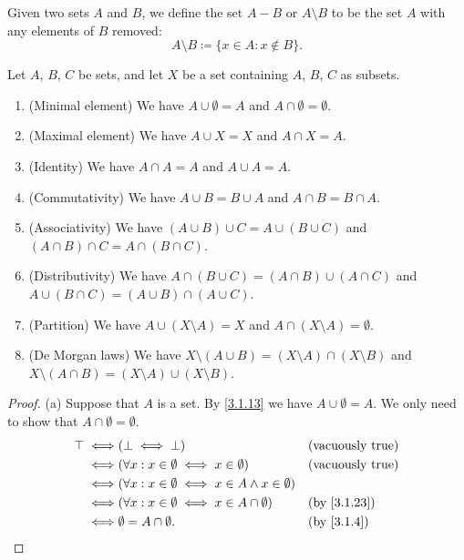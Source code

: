 \setcounter{thm}{26}
\begin{defn}\label{3.1.27}
  Given two sets \(A\) and \(B\), we define the set \(A - B\) or \(A \setminus B\) to be the set \(A\) with any elements of \(B\) removed:
  \[
    A \setminus B \coloneqq \{x \in A : x \notin B\}.
  \]
\end{defn}

\begin{prop}\label{3.1.28}
  Let \(A\), \(B\), \(C\) be sets, and let \(X\) be a set containing \(A\), \(B\), \(C\) as subsets.
  \begin{enumerate}
    \item (Minimal element) We have \(A \cup \emptyset = A\) and \(A \cap \emptyset = \emptyset\).
    \item (Maximal element) We have \(A \cup X = X\) and \(A \cap X = A\).
    \item (Identity) We have \(A \cap A = A\) and \(A \cup A = A\).
    \item (Commutativity) We have \(A \cup B = B \cup A\) and \(A \cap B = B \cap A\).
    \item (Associativity) We have \((A \cup B) \cup C = A \cup (B \cup C)\) and \((A \cap B) \cap C = A \cap (B \cap C)\).
    \item (Distributivity) We have \(A \cap (B \cup C) = (A \cap B) \cup (A \cap C)\) and \(A \cup (B \cap C) = (A \cup B) \cap (A \cup C)\).
    \item (Partition) We have \(A \cup (X \setminus A) = X\) and \(A \cap (X \setminus A) = \emptyset\).
    \item (De Morgan laws) We have \(X \setminus (A \cup B) = (X \setminus A) \cap (X \setminus B)\) and \(X \setminus (A \cap B) = (X \setminus A) \cup (X \setminus B)\).
  \end{enumerate}
\end{prop}

\begin{proof}{(a)}
  Suppose that \(A\) is a set.
  By \cref{3.1.13} we have \(A \cup \emptyset = A\).
  We only need to show that \(A \cap \emptyset = \emptyset\).
  \begin{align*}
    \top \iff & (\bot \iff \bot)                                                 &  & \text{(vacuously true)} \\
    \iff      & (\forall x : x \in \emptyset \iff x \in \emptyset)               &  & \text{(vacuously true)} \\
    \iff      & (\forall x : x \in \emptyset \iff x \in A \land x \in \emptyset)                              \\
    \iff      & (\forall x : x \in \emptyset \iff x \in A \cap \emptyset)        &  & \by{3.1.23}             \\
    \iff      & \emptyset = A \cap \emptyset.                                    &  & \by{3.1.4}
  \end{align*}
\end{proof}

